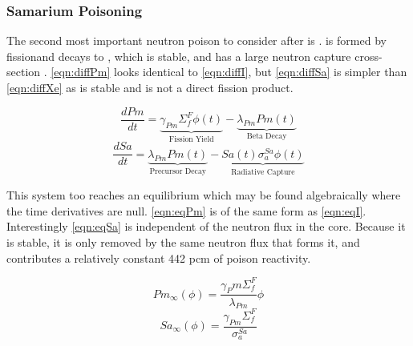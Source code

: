 \subsubsection{Samarium Poisoning}
The second most important neutron poison to consider after \Xe is \Sa. \Pm is formed by fission\footnotemark and decays to \Sa, which is stable, and has a large neutron capture cross-section \cite[Ch. 7]{Lamarsh}. \ref{eqn:diffPm} looks identical to \ref{eqn:diffI}, but \ref{eqn:diffSa} is simpler than \ref{eqn:diffXe} as \Sa is stable and is not a direct fission product.


\begin{equation}\label{eqn:diffPm}
    \frac{dPm}{dt} =
    \underbrace{\gamma_{Pm}\Sigma_{f}^{F}{\phi}(t)}_{\text{Fission Yield}}
    -\underbrace{\lambda_{Pm}Pm(t)}_{\text{Beta Decay}}
\end{equation}
\begin{equation}\label{eqn:diffSa}
        \frac{dSa}{dt} =
        \underbrace{\lambda_{Pm}Pm(t)}_{\text{Precursor Decay}}
        -
        \underbrace{Sa(t)\sigma_{a}^{Sa}{\phi}(t)}_{\text{Radiative Capture}}
\end{equation}

This system too reaches an equilibrium which may be found algebraically where the time derivatives are null. \ref{eqn:eqPm} is of the same form as \ref{eqn:eqI}. Interestingly \ref{eqn:eqSa} is independent of the neutron flux in the core. Because it is stable, it is only removed by the same neutron flux that forms it, and contributes a relatively constant 442 pcm of poison reactivity. 

\begin{equation}\label{eqn:eqPm}
    Pm_{\infty}(\phi) = \frac{\gamma_Pm \Sigma_f^F }{\lambda_{Pm}}\phi
\end{equation}
\begin{equation}\label{eqn:eqSa}
    Sa_{\infty}(\phi) = \frac{\gamma_{Pm} \Sigma_f^F }{\sigma_a^{Sa}}
\end{equation}

